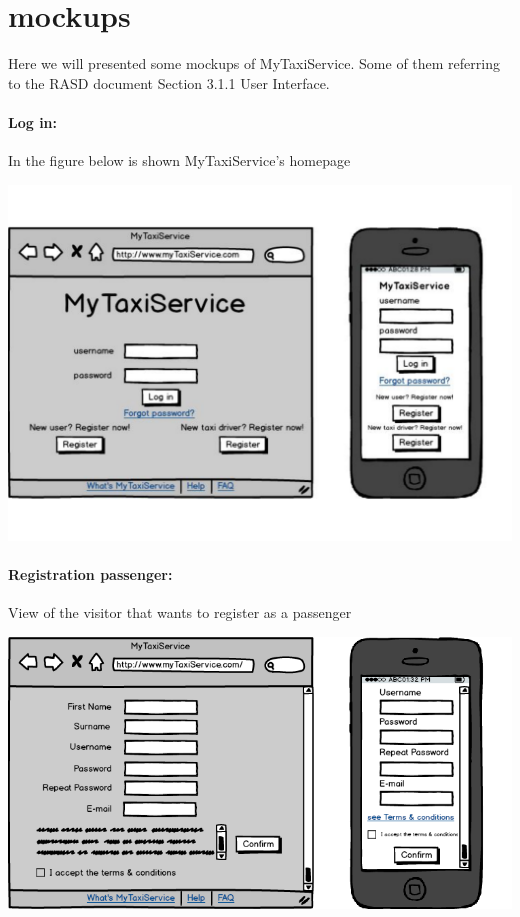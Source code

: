 \section{mockups}
Here we will presented some mockups of MyTaxiService. Some of them referring to the RASD document Section 3.1.1 User Interface.

\paragraph{Log in:}
In the figure below is shown MyTaxiService's homepage
\begin{center}
	\includegraphics[width=\textwidth]{mockup/login1.pdf}
\end{center}

\paragraph{Registration passenger:}
View of the visitor that wants to register as a passenger
\begin{center}
	\includegraphics[width=\textwidth]{mockup/registrationPassenger.png}
\end{center}

